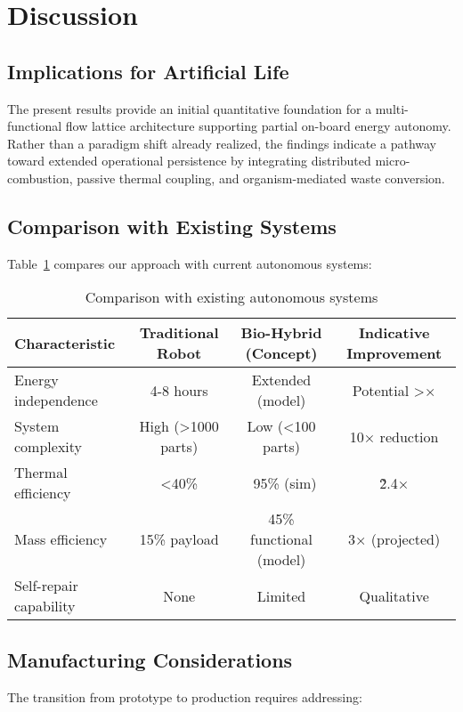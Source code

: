 \section{Discussion}
\label{sec:discussion}

\subsection{Implications for Artificial Life}

The present results provide an initial quantitative foundation for a multi-functional flow lattice architecture supporting partial on-board energy autonomy. Rather than a paradigm shift already realized, the findings indicate a pathway toward extended operational persistence by integrating distributed micro-combustion, passive thermal coupling, and organism-mediated waste conversion.

\subsection{Comparison with Existing Systems}

Table~\ref{tab:comparison} compares our approach with current autonomous systems:

\begin{table}[H]
\centering
\caption{Comparison with existing autonomous systems}
\label{tab:comparison}
\begin{tabular}{@{}lccc@{}}
\toprule
Characteristic & Traditional Robot & Bio-Hybrid (Concept) & Indicative Improvement \\
\midrule
Energy independence & 4-8 hours & Extended (model) & Potential >\!\!10× \\
System complexity & High (>1000 parts) & Low (<100 parts) & 10× reduction \\
Thermal efficiency & <40\% & ~95\% (sim) & \~2.4× \\
Mass efficiency & 15\% payload & 45\% functional (model) & 3× (projected) \\
Self-repair capability & None & Limited & Qualitative \\
\bottomrule
\end{tabular}
\end{table}

\subsection{Manufacturing Considerations}

The transition from prototype to production requires addressing:

